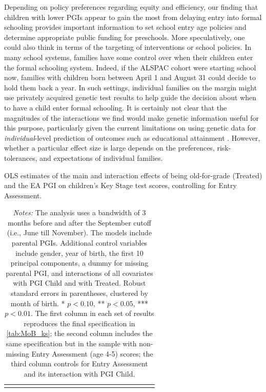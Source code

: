 \documentclass[12pt,a4paper]{article}
\begin{document}
\begin{bibunit}
Depending on policy preferences regarding equity and efficiency, our finding that children with lower PGIs appear to gain the most from delaying entry into formal schooling provides important information to set school entry age policies and determine appropriate public funding for preschools. More speculatively, one could also think in terms of the targeting of interventions or school policies. In many school systems, families have some control over when their children enter the formal schooling system. Indeed, if the ALSPAC cohort were starting school now, families with children born between April 1 and August 31 could decide to hold them back a year. In such settings, individual families on the margin might use privately acquired genetic test results to help guide the decision about when to have a child enter formal schooling.  It is certainly not clear that the magnitudes of the interactions we find would make genetic information useful for this purpose, particularly given the current limitations on using genetic data for \textit{individual}-level prediction of outcomes such as educational attainment \citep{morris2020can}. However, whether a particular effect size is large depends on the preferences, risk-tolerances, and expectations of individual families. 


\begin{landscape}
\begin{table}
\caption{OLS estimates of the main and interaction effects of being old-for-grade (Treated) and the EA PGI on children’s Key Stage test scores, controlling for Entry Assessment.}
\centering
{\scriptsize
\begin{tabular}{lcccccccccccccccccccc}
\toprule

\bottomrule
\addlinespace[.75ex]
\end{tabular}
\label{tab:mechan_ea}
}
\caption*{\scriptsize \noindent \textit{Notes:} The analysis uses a bandwidth of 3 months before and after the September cutoff (i.e., June till November). The models include parental PGIs. Additional control variables include gender, year of birth, the first 10 principal components, a dummy for missing parental PGI, and interactions of all covariates with PGI Child and with Treated. Robust standard errors in parentheses, clustered by month of birth. * $p < 0.10$, ** $p < 0.05$, *** $p < 0.01$. The first column in each set of results reproduces the final specification in \autoref{tab:MoB_ks}; the second column includes the same specification but in the sample with non-missing Entry Assessment (age 4-5) scores; the third column controls for Entry Assessment and its interaction with PGI Child.}
\end{table}
\end{landscape}


\end{bibunit}
\end{document}
